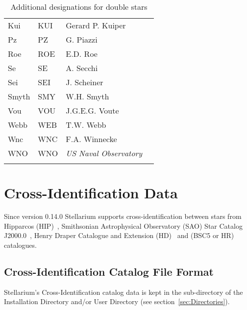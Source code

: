 \begin{longtable}{l|l|l|p{35mm}}
Kui  	        	& KUI 		 & Gerard P. Kuiper 		&  \\
Pz  	 	        & PZ  		 & G. Piazzi 			&  \\
Roe   	        	& ROE 		 & E.D. Roe 			&  \\
Se  	 	        & SE  		 & A. Secchi 			&  \\
Sei   		        & SEI 		 & J. Scheiner 			&  \\
Smyth  	 	        & SMY 		 & W.H. Smyth 			&  \\
Vou  	        	& VOU 		 & J.G.E.G. Voute		&  \\
Webb  		        & WEB 		 & T.W. Webb 			&  \\
Wnc  	        	& WNC 		 & F.A. Winnecke 		&  \\
WNO  	     		& WNO 		 & \emph{US Naval Observatory}  &  \\\bottomrule
\caption{Additional designations for double stars}
\label{tab:StarCatalogues:DoubleStars:Designations}
\end{longtable}

\section{Cross-Identification Data}
\label{sec:StarCatalogues:CrossIdentificationData}

Since version 0.14.0 Stellarium supports cross-identification between stars from 
Hipparcos (HIP)~\citep{2012AstL...38..331A}, 
Smithsonian Astrophysical Observatory (SAO) Star Catalog J2000.0~\citep{1995yCat.1131....0S}, Henry Draper Catalogue and Extension (HD)~\citep{1993yCat.3135....0C} and 
  (BSC5 or HR) %
catalogues.

\subsection{Cross-Identification Catalog File Format}
\label{sec:StarCatalogues:CrossIdentificationData:format}


Stellarium's Cross-Identification catalog data is kept
in the  sub-directory of the Installation Directory and/or User Directory (see section~\ref{sec:Directories}).

